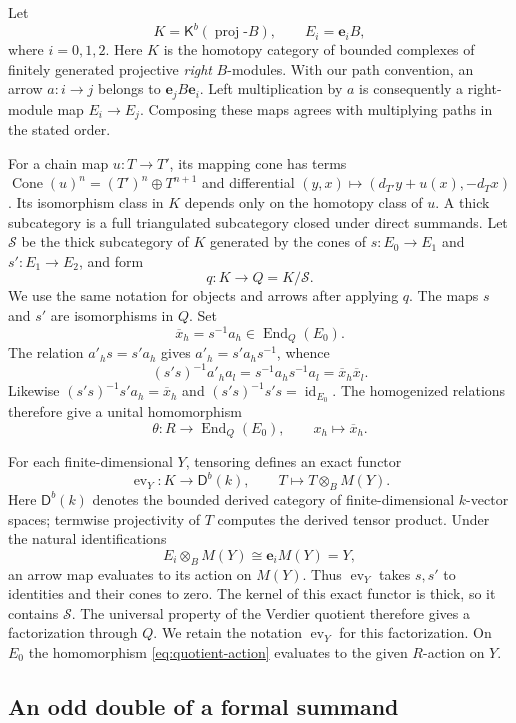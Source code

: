 \documentclass[11pt]{article}
\numberwithin{equation}{section}
\theoremstyle{definition}
\theoremstyle{remark}
\newcommand{\D}{\mathsf D}
\newcommand{\K}{\mathsf K}
\DeclareMathOperator{\End}{End}
\DeclareMathOperator{\id}{id}
\DeclareMathOperator{\Cone}{Cone}
\DeclareMathOperator{\proj}{proj}
\begin{document}
Let
\[
  K=\K^b(\proj\text{-}B),\qquad E_i=\mathbf e_iB,
\]
where $i=0,1,2$. Here $K$ is the homotopy category of bounded complexes of finitely
generated projective \emph{right} $B$-modules.  With our path convention,
an arrow $a:i\to j$ belongs to $\mathbf e_jB\mathbf e_i$.
Left multiplication by $a$ is consequently a right-module map
$E_i\to E_j$.  Composing these maps agrees with multiplying paths
in the stated order.

For a chain map $u:T\to T'$, its mapping cone has terms
$\Cone(u)^n=(T')^n\oplus T^{n+1}$ and differential
$(y,x)\mapsto(d_{T'}y+u(x),-d_Tx)$. Its isomorphism class
in $K$ depends only on the homotopy class of $u$.
A thick subcategory is a full triangulated subcategory closed under
direct summands. Let $\mathcal S$ be the thick subcategory of $K$ generated by the
cones of $s:E_0\to E_1$ and $s':E_1\to E_2$, and form
\[
  q:K\longrightarrow Q=K/\mathcal S.
\]
We use the same notation for objects and arrows after applying $q$.
The maps $s$ and $s'$ are isomorphisms in $Q$.  Set
\[
  \overline x_h=s^{-1}a_h\in\End_Q(E_0).
\]
The relation $a'_h s=s'a_h$ gives $a'_h=s'a_hs^{-1}$, whence
\[
  (s's)^{-1}a'_ha_l
     =s^{-1}a_hs^{-1}a_l
     =\overline x_h\overline x_l.
\]
Likewise $(s's)^{-1}s'a_h=\overline x_h$ and
$(s's)^{-1}s's=\id_{E_0}$.  The homogenized relations therefore give
a unital homomorphism
\begin{equation}\label{eq:quotient-action}
  \theta:R\longrightarrow\End_Q(E_0),
  \qquad x_h\longmapsto\overline x_h.
\end{equation}

For each finite-dimensional $Y$, tensoring defines an exact functor
\[
  \operatorname{ev}_Y:K\longrightarrow\D^b(k),
  \qquad T\longmapsto T\otimes_B M(Y).
\]
Here $\D^b(k)$ denotes the bounded derived category of finite-dimensional
$k$-vector spaces; termwise projectivity of $T$ computes the derived
tensor product.  Under the natural identifications
\[
  E_i\otimes_B M(Y)\cong\mathbf e_iM(Y)=Y,
\]
an arrow map evaluates to its action on $M(Y)$.  Thus
$\operatorname{ev}_Y$ takes $s,s'$ to identities and their cones to zero.
The kernel of this exact functor is thick, so it contains $\mathcal S$.
The universal property of the Verdier quotient
\cite[Tag 05RJ]{StacksProject} therefore gives a factorization through $Q$.
We retain the notation $\operatorname{ev}_Y$ for this factorization.
On $E_0$ the homomorphism \eqref{eq:quotient-action} evaluates to the
given $R$-action on $Y$.

\subsection{An odd double of a formal summand}
\end{document}
